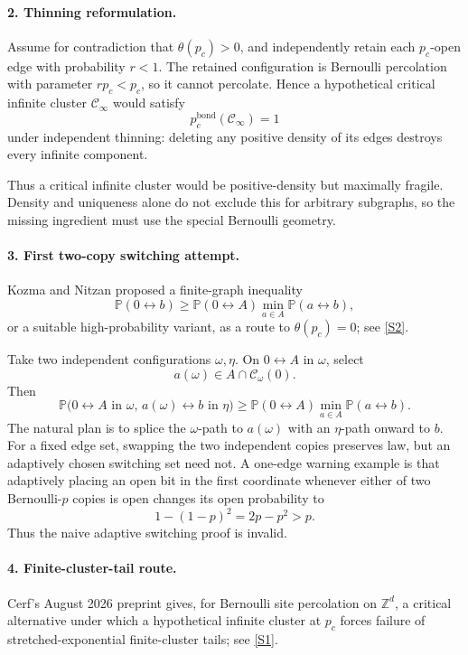 \documentclass[11pt]{article}
\begin{document}
\paragraph{2. Thinning reformulation.}
Assume for contradiction that \(\theta(p_c)>0\), and independently retain each \(p_c\)-open edge with probability \(r<1\). The retained configuration is Bernoulli percolation with parameter \(rp_c<p_c\), so it cannot percolate. Hence a hypothetical critical infinite cluster \(\mathcal C_\infty\) would satisfy
\[
\boxed{p_c^{\mathrm{bond}}(\mathcal C_\infty)=1}
\]
under independent thinning: deleting any positive density of its edges destroys every infinite component.

Thus a critical infinite cluster would be positive-density but maximally fragile. Density and uniqueness alone do not exclude this for arbitrary subgraphs, so the missing ingredient must use the special Bernoulli geometry.

\paragraph{3. First two-copy switching attempt.}
Kozma and Nitzan proposed a finite-graph inequality
\[
\tag{KN}\label{eq:kn}
\mathbb P(0\leftrightarrow b)
\ge
\mathbb P(0\leftrightarrow A)
\min_{a\in A}\mathbb P(a\leftrightarrow b),
\]
or a suitable high-probability variant, as a route to \(\theta(p_c)=0\); see \href{https://arxiv.org/html/2401.12397v1}{[S2]}.

Take two independent configurations \(\omega,\eta\). On \(0\leftrightarrow A\) in \(\omega\), select
\[
a(\omega)\in A\cap\mathcal C_\omega(0).
\]
Then
\[
\mathbb P\bigl(
0\leftrightarrow A\text{ in }\omega,\,
a(\omega)\leftrightarrow b\text{ in }\eta
\bigr)
\ge
\mathbb P(0\leftrightarrow A)
\min_{a\in A}\mathbb P(a\leftrightarrow b).
\]
The natural plan is to splice the \(\omega\)-path to \(a(\omega)\) with an \(\eta\)-path onward to \(b\). For a fixed edge set, swapping the two independent copies preserves law, but an adaptively chosen switching set need not. A one-edge warning example is that adaptively placing an open bit in the first coordinate whenever either of two Bernoulli-\(p\) copies is open changes its open probability to
\[
1-(1-p)^2=2p-p^2>p.
\]
Thus the naive adaptive switching proof is invalid.

\paragraph{4. Finite-cluster-tail route.}
Cerf's August 2026 preprint gives, for Bernoulli site percolation on \(\mathbb Z^d\), a critical alternative under which a hypothetical infinite cluster at \(p_c\) forces failure of stretched-exponential finite-cluster tails; see \href{https://arxiv.org/html/2608.23661v1}{[S1]}.
\end{document}
